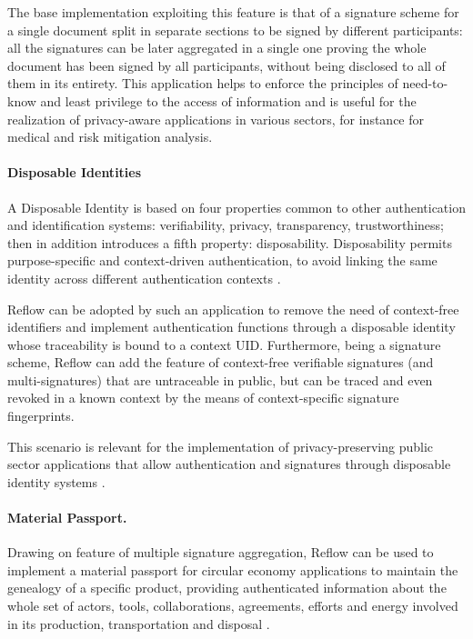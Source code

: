 \documentclass[twocolumn]{article}
\begin{document}
The base implementation exploiting this feature is that of a signature
scheme for a single document split in separate sections to be signed by
different participants: all the signatures can be later aggregated in a
single one proving the whole document has been signed by all
participants, without being disclosed to all of them in its entirety.
This application helps to enforce the principles of need-to-know and
least privilege to the access of information \citep{info-protection} and
is useful for the realization of privacy-aware applications in various
sectors, for instance for medical and risk mitigation analysis.


\paragraph*{Disposable Identities}

A Disposable Identity is based on four properties common to other
authentication and identification systems: verifiability, privacy,
transparency, trustworthiness; then in addition introduces a fifth
property: disposability. Disposability permits purpose-specific and
context-driven authentication, to avoid linking the same identity across
different authentication contexts \citep{dispid}.

Reflow can be adopted by such an application to remove the need of
context-free identifiers and implement authentication functions through
a disposable identity whose traceability is bound to a context UID.
Furthermore, being a signature scheme, Reflow can add the feature of
context-free verifiable signatures (and multi-signatures) that are
untraceable in public, but can be traced and even revoked in a known
context by the means of context-specific signature fingerprints.

This scenario is relevant for the implementation of privacy-preserving
public sector applications that allow authentication and signatures
through disposable identity systems \citep{dispid-kranenbu}.   


\paragraph*{Material Passport.}
Drawing on feature of multiple signature aggregation, Reflow can
be used to implement a {material passport} for circular economy
applications \citep{material-passport} to maintain the genealogy of a
specific product, providing authenticated information about  the whole
set of actors, tools, collaborations, agreements, efforts and energy
involved in its production, transportation and disposal
\citep{Reflow-os}.
\end{document}
